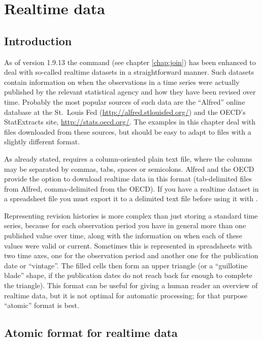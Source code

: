 \chapter{Realtime data}
\label{chap:realtime}

\section{Introduction}
\label{sec:realtime-intro}

As of  version 1.9.13 the  command (see chapter
\ref{chap:join}) has been enhanced to deal with so-called realtime
datasets in a straightforward manner.  Such datasets contain
information on when the observations in a time series were actually
published by the relevant statistical agency and how they have been
revised over time. Probably the most popular sources of such data are
the ``Alfred'' online database at the St.\ Louis Fed
(\url{http://alfred.stlouisfed.org/}) and the OECD's
\textsf{StatExtracts} site, \url{http://stats.oecd.org/}.  The
examples in this chapter deal with files downloaded from these
sources, but should be easy to adapt to files with a slightly
different format.

As already stated,  requires a column-oriented plain text
file, where the columns may be separated by commas, tabs, spaces or
semicolons. Alfred and the OECD provide the option to download
realtime data in this format (tab-delimited files from Alfred,
comma-delimited from the OECD). If you have a realtime dataset in a
spreadsheet file you must export it to a delimited text file before
using it with .

Representing revision histories is more complex than just storing a
standard time series, because for each observation period you have in
general more than one published value over time, along with the
information on when each of these values were valid or
current. Sometimes this is represented in spreadsheets with two time
axes, one for the observation period and another one for the
publication date or ``vintage''. The filled cells then form an upper
triangle (or a ``guillotine blade'' shape, if the publication dates do
not reach back far enough to complete the triangle). This format can
be useful for giving a human reader an overview of realtime data, but
it is not optimal for automatic processing; for that purpose
``atomic'' format is best.

\section{Atomic format for realtime data}
\label{sec:realtime-atomic}

